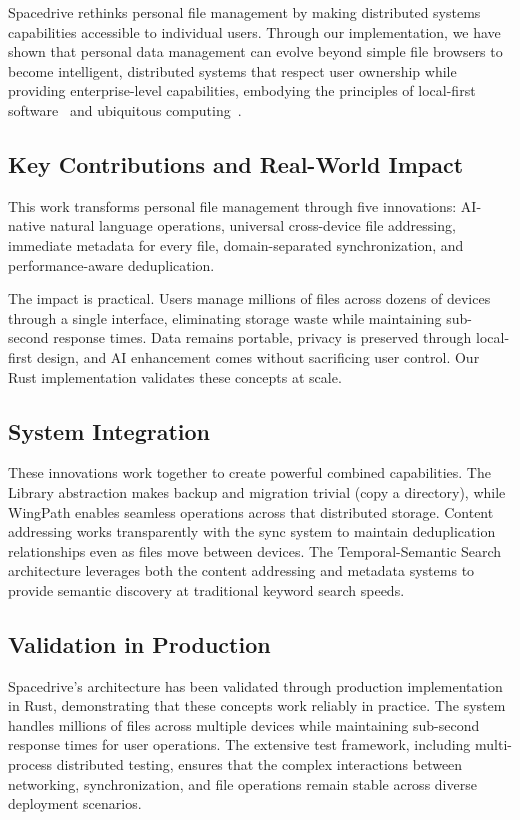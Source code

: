 \documentclass[sigconf]{acmart}
\begin{document}
Spacedrive rethinks personal file management by making distributed systems capabilities accessible to individual users. Through our implementation, we have shown that personal data management can evolve beyond simple file browsers to become intelligent, distributed systems that respect user ownership while providing enterprise-level capabilities, embodying the principles of local-first software~\cite{kleppmann_localfirst_2019} and ubiquitous computing~\cite{weiser_ubiquitous_1991}.

\subsection{Key Contributions and Real-World Impact}
This work transforms personal file management through five innovations: AI-native natural language operations, universal cross-device file addressing, immediate metadata for every file, domain-separated synchronization, and performance-aware deduplication.

The impact is practical. Users manage millions of files across dozens of devices through a single interface, eliminating storage waste while maintaining sub-second response times. Data remains portable, privacy is preserved through local-first design, and AI enhancement comes without sacrificing user control. Our Rust implementation validates these concepts at scale.

\subsection{System Integration}
These innovations work together to create powerful combined capabilities. The Library abstraction makes backup and migration trivial (copy a directory), while WingPath enables seamless operations across that distributed storage. Content addressing works transparently with the sync system to maintain deduplication relationships even as files move between devices. The Temporal-Semantic Search architecture leverages both the content addressing and metadata systems to provide semantic discovery at traditional keyword search speeds.

\subsection{Validation in Production}
Spacedrive's architecture has been validated through production implementation in Rust, demonstrating that these concepts work reliably in practice. The system handles millions of files across multiple devices while maintaining sub-second response times for user operations. The extensive test framework, including multi-process distributed testing, ensures that the complex interactions between networking, synchronization, and file operations remain stable across diverse deployment scenarios.
\end{document}

